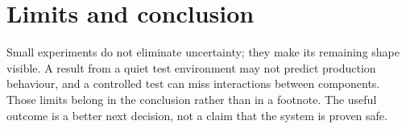 \documentclass[11pt,a4paper]{article}
\begin{document}

\section{Limits and conclusion}
Small experiments do not eliminate uncertainty; they make its remaining shape
visible. A result from a quiet test environment may not predict production
behaviour, and a controlled test can miss interactions between components.
Those limits belong in the conclusion rather than in a footnote. The useful
outcome is a better next decision, not a claim that the system is proven safe.

\rrule
{}
\end{document}
